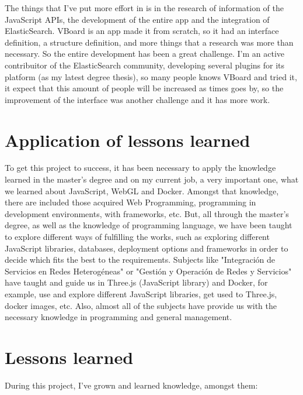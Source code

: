 \documentclass[a4paper, 12pt]{book}
\begin{document}
The things that I've put more effort in is in the research of information of the JavaScript APIs, the development of the entire app and the integration of ElasticSearch. VBoard is an app made it from scratch, so it had an interface definition, a structure definition, and more things that a research was more than necessary. So the entire development has been a great challenge. I'm an active contribuitor of the ElasticSearch community, developing several plugins for its platform (as my latest degree thesis), so many people knows VBoard and tried it, it expect that this amount of people will be increased as times goes by, so the improvement of the interface was another challenge and it has more work.

\section{Application of lessons learned}
\label{sec:aplication}

To get this project to success, it has been necessary to apply the knowledge learned in the master's degree and on my current job, a very important one, what we learned about JavaScript, WebGL and Docker. Amongst that knowledge, there are included those acquired Web Programming, programming in development environments, with frameworks, etc. But, all through the master's degree, as well as the knowledge of programming language, we have been taught to explore different ways of fulfilling the works, such as exploring different JavaScript libraries, databases, deployment options and frameworks in order to decide which fits the best to the requirements.
Subjects like "Integración de Servicios en Redes Heterogéneas" or "Gestión y Operación de Redes y Servicios" have taught and guide us in Three.js (JavaScript library) and Docker, for example, use and explore different JavaScript libraries, get used to Three.js, docker images, etc. Also, almost all of the subjects have provide us with the necessary knowledge in programming and general management.


\section{Lessons learned}
\label{sec:ll}

During this project, I've grown and learned knowledge, amongst them:
\end{document}
